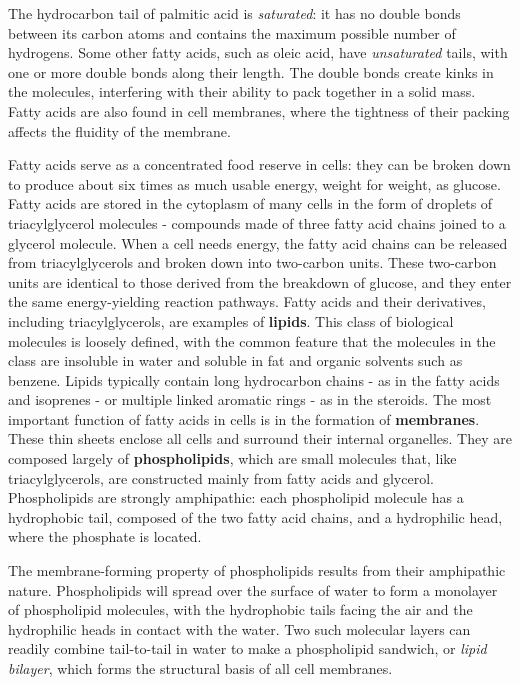 The hydrocarbon tail of palmitic acid is \textit{saturated}: it has no double bonds
between its carbon atoms and contains the maximum possible number
of hydrogens. Some other fatty acids, such as oleic acid, have
\textit{unsaturated} tails, with one or more double bonds along their length. The
double bonds create kinks in the molecules, interfering with their ability
to pack together in a solid mass. Fatty acids are also found in
cell membranes, where the tightness of their packing affects the fluidity
of the membrane.

Fatty acids serve as a concentrated food reserve in cells: they can be
broken down to produce about six times as much usable energy, weight
for weight, as glucose. Fatty acids are stored in the cytoplasm of many cells
in the form of droplets of triacylglycerol molecules - compounds made of
three fatty acid chains joined to a glycerol molecule. When a cell needs
energy, the fatty acid chains can be released from triacylglycerols and
broken down into two-carbon units. These two-carbon units are identical
to those derived from the breakdown of glucose, and they enter the same
energy-yielding reaction pathways.
Fatty acids and their derivatives, including triacylglycerols, are examples
of \textbf{lipids}. This class of biological molecules is loosely defined, with the
common feature that the molecules in the class are insoluble in water and
soluble in fat and organic solvents such as benzene. Lipids typically contain
long hydrocarbon chains - as in the fatty acids and isoprenes - or multiple
linked aromatic rings - as in the steroids.
The most important function of fatty acids in cells is in the formation of
\textbf{membranes}. These thin sheets enclose all cells and surround their internal
organelles. They are composed largely of \textbf{phospholipids}, which are small
molecules that, like triacylglycerols, are constructed mainly from fatty
acids and glycerol. Phospholipids are strongly amphipathic: each phospholipid
molecule has a hydrophobic tail, composed of the two fatty acid chains,
and a hydrophilic head, where the phosphate is located.

The membrane-forming property of phospholipids results from their
amphipathic nature. Phospholipids will spread over the surface of water to
form a monolayer of phospholipid molecules, with the hydrophobic tails
facing the air and the hydrophilic heads in contact with the water. Two
such molecular layers can readily combine tail-to-tail in water to make a
phospholipid sandwich, or \textit{lipid bilayer}, which forms the structural basis
of all cell membranes.

